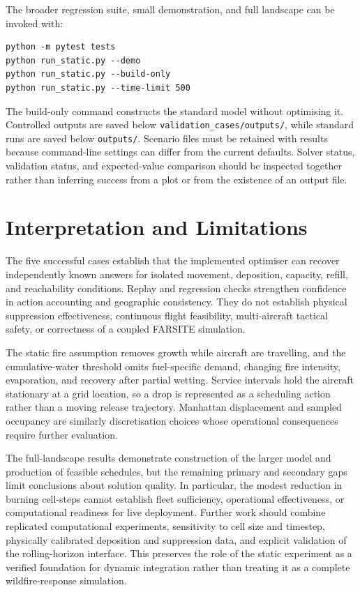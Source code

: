 The broader regression suite, small demonstration, and full landscape can be invoked with:
\begin{verbatim}
python -m pytest tests
python run_static.py --demo
python run_static.py --build-only
python run_static.py --time-limit 500
\end{verbatim}
The build-only command constructs the standard model without optimising it. Controlled outputs are saved below \texttt{validation\_cases/outputs/}, while standard runs are saved below \texttt{outputs/}. Scenario files must be retained with results because command-line settings can differ from the current defaults. Solver status, validation status, and expected-value comparison should be inspected together rather than inferring success from a plot or from the existence of an output file.

\section{Interpretation and Limitations}
\label{sec:validation-limitations}

The five successful cases establish that the implemented optimiser can recover independently known answers for isolated movement, deposition, capacity, refill, and reachability conditions. Replay and regression checks strengthen confidence in action accounting and geographic consistency. They do not establish physical suppression effectiveness, continuous flight feasibility, multi-aircraft tactical safety, or correctness of a coupled FARSITE simulation.

The static fire assumption removes growth while aircraft are travelling, and the cumulative-water threshold omits fuel-specific demand, changing fire intensity, evaporation, and recovery after partial wetting. Service intervals hold the aircraft stationary at a grid location, so a drop is represented as a scheduling action rather than a moving release trajectory. Manhattan displacement and sampled occupancy are similarly discretisation choices whose operational consequences require further evaluation.

The full-landscape results demonstrate construction of the larger model and production of feasible schedules, but the remaining primary and secondary gaps limit conclusions about solution quality. In particular, the modest reduction in burning cell-steps cannot establish fleet sufficiency, operational effectiveness, or computational readiness for live deployment. Further work should combine replicated computational experiments, sensitivity to cell size and timestep, physically calibrated deposition and suppression data, and explicit validation of the rolling-horizon interface. This preserves the role of the static experiment as a verified foundation for dynamic integration rather than treating it as a complete wildfire-response simulation.
